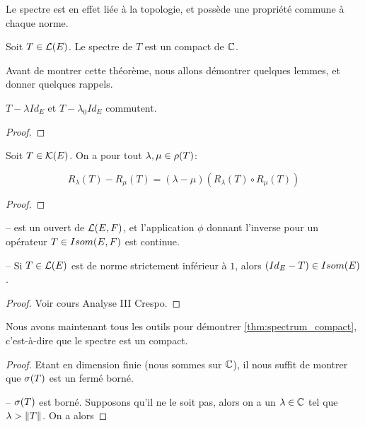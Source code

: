 Le spectre est en effet liée à la topologie, et possède une propriété commune à
chaque norme.

\begin{theorem}
	\label{thm:spectrum_compact}
	Soit $T \in \mathcal{L}(E)$.
	Le spectre de $T$ est un compact de $\mathbb{C}$.
\end{theorem}

Avant de montrer cette théorème, nous allons démontrer quelques lemmes, et
donner quelques rappels.

\begin{lemma}
	$T - \lambda Id_{E}$ et $T - \lambda_{0} Id_{E}$ commutent.
\end{lemma}

\begin{proof}
	
\end{proof}

\begin{proposition} 
	\label{prop:resolvante_identity}
	Soit $T \in \mathcal{K}(E)$.
	On a pour tout $\lambda, \mu \in \rho(T)$:

	\begin{equation}
		R_{\lambda}(T) - R_{\mu}(T) = (\lambda - \mu) (R_{\lambda}(T) \circ
		R_{\mu}(T))
	\end{equation}
\end{proposition}

\begin{proof}

\end{proof}

\begin{proposition}
	--  est un ouvert de $\mathcal{L}(E, F)$, et
	l'application $\phi$ donnant l'inverse pour un opérateur $T \in
	Isom(E, F)$ est continue.

	-- Si $T \in \mathcal{L}(E)$ est de norme strictement inférieur à $1$,
	alors $(Id_{E} - T) \in Isom(E)$.
\end{proposition}

\begin{proof}
	Voir cours Analyse III Crespo.
\end{proof}

Nous avons maintenant tous les outils pour démontrer
\ref{thm:spectrum_compact}, c'est-à-dire que le spectre est un compact.

\begin{proof}
	Etant en dimension finie (nous sommes sur $\mathbb{C}$), il nous suffit de
	montrer que $\sigma(T)$ est un fermé borné.

	-- $\sigma(T)$ est borné. Supposons qu'il ne le soit pas, alors on a un
	$\lambda \in \mathbb{C}$ tel que $\lambda > \norm{T}$. On a alors 
\end{proof}


